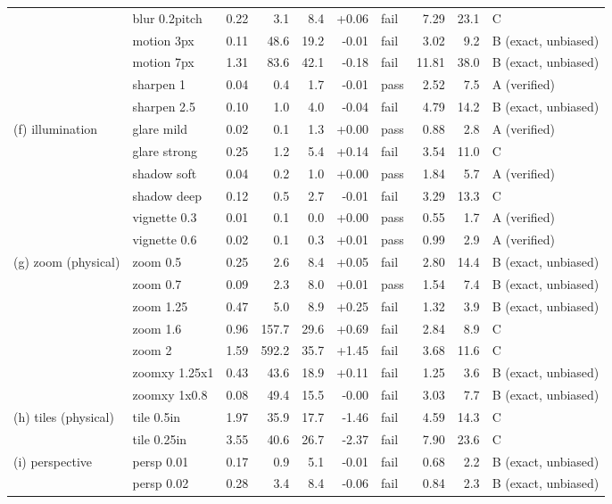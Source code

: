 \begin{tabular}{llrrrrlrrl}
 & blur 0.2pitch & 0.22 & 3.1 & 8.4 & +0.06 & fail & 7.29 & 23.1 & C \\
 & motion 3px & 0.11 & 48.6 & 19.2 & -0.01 & fail & 3.02 & 9.2 & B (exact, unbiased) \\
 & motion 7px & 1.31 & 83.6 & 42.1 & -0.18 & fail & 11.81 & 38.0 & B (exact, unbiased) \\
 & sharpen 1 & 0.04 & 0.4 & 1.7 & -0.01 & pass & 2.52 & 7.5 & A (verified) \\
 & sharpen 2.5 & 0.10 & 1.0 & 4.0 & -0.04 & fail & 4.79 & 14.2 & B (exact, unbiased) \\
(f) illumination & glare mild & 0.02 & 0.1 & 1.3 & +0.00 & pass & 0.88 & 2.8 & A (verified) \\
 & glare strong & 0.25 & 1.2 & 5.4 & +0.14 & fail & 3.54 & 11.0 & C \\
 & shadow soft & 0.04 & 0.2 & 1.0 & +0.00 & pass & 1.84 & 5.7 & A (verified) \\
 & shadow deep & 0.12 & 0.5 & 2.7 & -0.01 & fail & 3.29 & 13.3 & C \\
 & vignette 0.3 & 0.01 & 0.1 & 0.0 & +0.00 & pass & 0.55 & 1.7 & A (verified) \\
 & vignette 0.6 & 0.02 & 0.1 & 0.3 & +0.01 & pass & 0.99 & 2.9 & A (verified) \\
(g) zoom (physical) & zoom 0.5 & 0.25 & 2.6 & 8.4 & +0.05 & fail & 2.80 & 14.4 & B (exact, unbiased) \\
 & zoom 0.7 & 0.09 & 2.3 & 8.0 & +0.01 & pass & 1.54 & 7.4 & B (exact, unbiased) \\
 & zoom 1.25 & 0.47 & 5.0 & 8.9 & +0.25 & fail & 1.32 & 3.9 & B (exact, unbiased) \\
 & zoom 1.6 & 0.96 & 157.7 & 29.6 & +0.69 & fail & 2.84 & 8.9 & C \\
 & zoom 2 & 1.59 & 592.2 & 35.7 & +1.45 & fail & 3.68 & 11.6 & C \\
 & zoomxy 1.25x1 & 0.43 & 43.6 & 18.9 & +0.11 & fail & 1.25 & 3.6 & B (exact, unbiased) \\
 & zoomxy 1x0.8 & 0.08 & 49.4 & 15.5 & -0.00 & fail & 3.03 & 7.7 & B (exact, unbiased) \\
(h) tiles (physical) & tile 0.5in & 1.97 & 35.9 & 17.7 & -1.46 & fail & 4.59 & 14.3 & C \\
 & tile 0.25in & 3.55 & 40.6 & 26.7 & -2.37 & fail & 7.90 & 23.6 & C \\
(i) perspective & persp 0.01 & 0.17 & 0.9 & 5.1 & -0.01 & fail & 0.68 & 2.2 & B (exact, unbiased) \\
 & persp 0.02 & 0.28 & 3.4 & 8.4 & -0.06 & fail & 0.84 & 2.3 & B (exact, unbiased) \\

\end{tabular}
